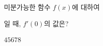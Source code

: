미분가능한 함수 $f(x)$에 대하여 \par\smallskip{}\par\smallskip\noindent 일 때, $f'(0)$의 값은?
\begin{choices32}{$4$}{$5$}{$6$}{$7$}{$8$}\end{choices32}
